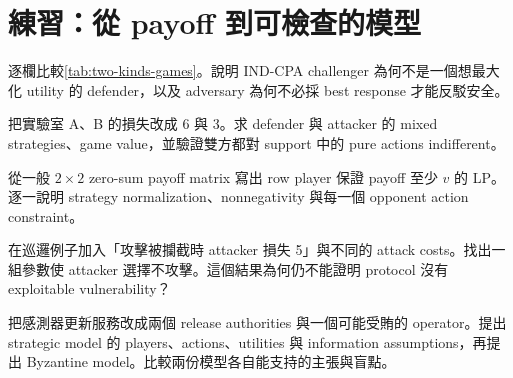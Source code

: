 \documentclass[11pt,a4paper,oneside,openany]{book}
\begin{document}
\section{練習：從 payoff 到可檢查的模型}
\begin{exercise}
逐欄比較\cref{tab:two-kinds-games}。說明 IND-CPA challenger 為何不是一個想最大化 utility 的 defender，以及 adversary 為何不必採 best response 才能反駁安全。
\end{exercise}

\begin{exercise}
把實驗室 A、B 的損失改成 6 與 3。求 defender 與 attacker 的 mixed strategies、game value，並驗證雙方都對 support 中的 pure actions indifferent。
\end{exercise}

\begin{exercise}
從一般 $2\times2$ zero-sum payoff matrix 寫出 row player 保證 payoff 至少 $v$ 的 LP。逐一說明 strategy normalization、nonnegativity 與每一個 opponent action constraint。
\end{exercise}

\begin{exercise}
在巡邏例子加入「攻擊被攔截時 attacker 損失 5」與不同的 attack costs。找出一組參數使 attacker 選擇不攻擊。這個結果為何仍不能證明 protocol 沒有 exploitable vulnerability？
\end{exercise}

\begin{exercise}
把感測器更新服務改成兩個 release authorities 與一個可能受賄的 operator。提出 strategic model 的 players、actions、utilities 與 information assumptions，再提出 Byzantine model。比較兩份模型各自能支持的主張與盲點。
\end{exercise}
\end{document}
